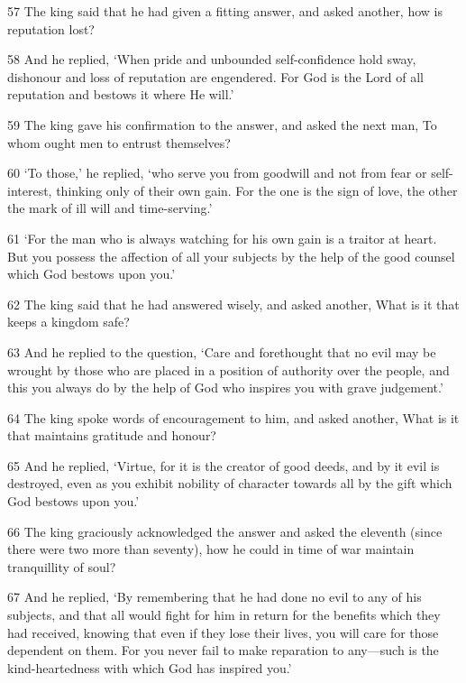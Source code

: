 \par 57 The king said that he had given a fitting answer, and asked another, how is reputation lost?

\par 58 And he replied, ‘When pride and unbounded self-confidence hold sway, dishonour and loss of reputation are engendered. For God is the Lord of all reputation and bestows it where He will.’

\par 59 The king gave his confirmation to the answer, and asked the next man, To whom ought men to entrust themselves?

\par 60 ‘To those,’ he replied, ‘who serve you from goodwill and not from fear or self-interest, thinking only of their own gain. For the one is the sign of love, the other the mark of ill will and time-serving.’

\par 61 ‘For the man who is always watching for his own gain is a traitor at heart. But you possess the affection of all your subjects by the help of the good counsel which God bestows upon you.’

\par 62 The king said that he had answered wisely, and asked another, What is it that keeps a kingdom safe?

\par 63 And he replied to the question, ‘Care and forethought that no evil may be wrought by those who are placed in a position of authority over the people, and this you always do by the help of God who inspires you with grave judgement.’

\par 64 The king spoke words of encouragement to him, and asked another, What is it that maintains gratitude and honour?

\par 65 And he replied, ‘Virtue, for it is the creator of good deeds, and by it evil is destroyed, even as you exhibit nobility of character towards all by the gift which God bestows upon you.’

\par 66 The king graciously acknowledged the answer and asked the eleventh (since there were two more than seventy), how he could in time of war maintain tranquillity of soul?

\par 67 And he replied, ‘By remembering that he had done no evil to any of his subjects, and that all would fight for him in return for the benefits which they had received, knowing that even if they lose their lives, you will care for those dependent on them. For you never fail to make reparation to any—such is the kind-heartedness with which God has inspired you.’

